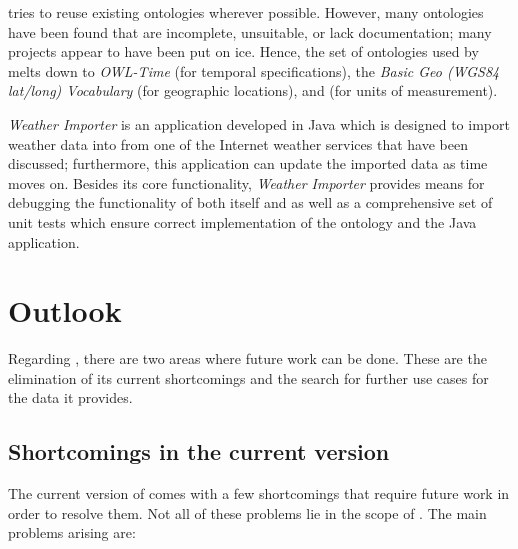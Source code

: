 \smarthomeweather tries to reuse existing ontologies wherever possible. However, many ontologies have been found that are incomplete, unsuitable, or lack documentation; many projects appear to have been put on ice. Hence, the set of ontologies used by \smarthomeweather melts down to \emph{OWL-Time} (for temporal specifications), the \emph{Basic Geo (\acs{WGS84} lat/long) Vocabulary} (for geographic locations), and \muo (for units of measurement).

\emph{Weather Importer} is an application developed in Java which is designed to import weather data into \smarthomeweather from one of the Internet weather services that have been discussed; furthermore, this application can update the imported data as time moves on. Besides its core functionality, \emph{Weather Importer} provides means for debugging the functionality of both itself and \smarthomeweather as well as a comprehensive set of unit tests which ensure correct implementation of the ontology and the Java application.

\section{Outlook}

Regarding \smarthomeweather, there are two areas where future work can be done. These are the elimination of its current shortcomings and the search for further use cases for the data it provides.

\subsection{Shortcomings in the current version}

The current version of \smarthomeweather comes with a few shortcomings that require future work in order to resolve them. Not all of these problems lie in the scope of \smarthomeweather. The main problems arising are:

